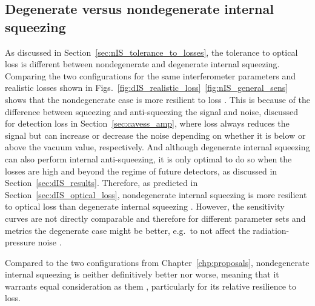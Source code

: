 \subsection{Degenerate versus nondegenerate internal squeezing}

As discussed in Section~\ref{sec:nIS_tolerance_to_losses}, the tolerance to optical loss is different between nondegenerate and degenerate internal squeezing. Comparing the two configurations for the same interferometer parameters and realistic losses shown in Figs.~\ref{fig:dIS_realistic_loss}~\ref{fig:nIS_general_sens}  shows that the nondegenerate case is more resilient to loss . 
This is because of the difference between squeezing and anti-squeezing the signal and noise, discussed for detection loss in Section~\ref{sec:cavess_amp}, where loss always reduces the signal but can increase or decrease the noise depending on whether it is below or above the vacuum value, respectively. And although degenerate internal squeezing can also perform internal anti-squeezing, it is only optimal to do so when the losses are high and beyond the regime of future detectors, as discussed in Section~\ref{sec:dIS_results}. 
Therefore, as predicted in Section~\ref{sec:dIS_optical_loss}, nondegenerate internal squeezing is more resilient to optical loss than degenerate internal squeezing . However, the sensitivity curves are not directly comparable and therefore for different parameter sets and metrics the degenerate case might be better, e.g.\ to not affect the radiation-pressure noise . %


Compared to the two configurations from Chapter~\ref{chp:proposals}, nondegenerate internal squeezing is neither definitively better nor worse, meaning that it warrants equal consideration as them , particularly for its relative resilience to loss. %


